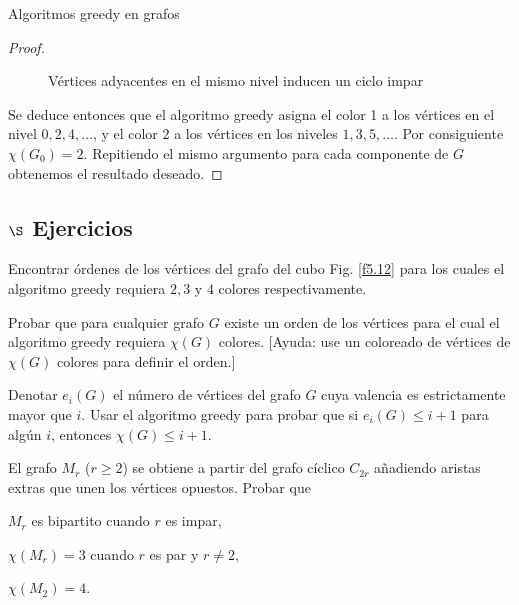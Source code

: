 \begin{section}{Algoritmos greedy en grafos}
\begin{proof}
\begin{figure}[ht]
    \begin{center}
    \end{center}
    \caption{Vértices adyacentes en el mismo nivel inducen un ciclo impar} \label{f5.13}
\end{figure}

Se deduce entonces que el algoritmo greedy asigna el color 1 a los vértices en el nivel $0,2,4,\ldots$, y el color $2$ a los vértices en los niveles $1,3,5,\ldots$. Por consiguiente $\chi(G_0)=2$. Repitiendo el mismo argumento para cada componente de $G$ obtenemos el resultado deseado.
\end{proof}

\subsection*{$\S$ Ejercicios}\label{ejercicio5.7} 
\begin{enumex}
\item Encontrar órdenes de los vértices del grafo del cubo Fig. \ref{f5.12}  para los cuales el algoritmo greedy requiera $2, 3$ y $4$ colores respectivamente.
\item \label{ejercicio5.7.2} Probar que para cualquier grafo $G$ existe un orden de los vértices para el cual el algoritmo greedy requiera $\chi(G)$ colores. [Ayuda: use un coloreado de vértices de $\chi(G)$ colores para definir el orden.]
\item Denotar $e_i(G)$ el número de vértices del grafo $G$ cuya valencia es estrictamente mayor que $i$. Usar el algoritmo greedy para probar que si $e_i(G) \le i+1$ para algún $i$, entonces $\chi(G) \le
i+1$.
\item El grafo $M_r$ ($r\ge 2$) se obtiene a partir del grafo cíclico $C_{2r}$ añadiendo aristas extras que unen los vértices opuestos. Probar que 
\begin{enumex}
    \item $M_r$ es bipartito cuando $r$ es impar,
    
    \item $\chi(M_r)=3$ cuando $r$ es par y $r\not= 2$,
    
    \item $\chi(M_2)=4$.
\end{enumex}
\end{enumex}
\end{section}
